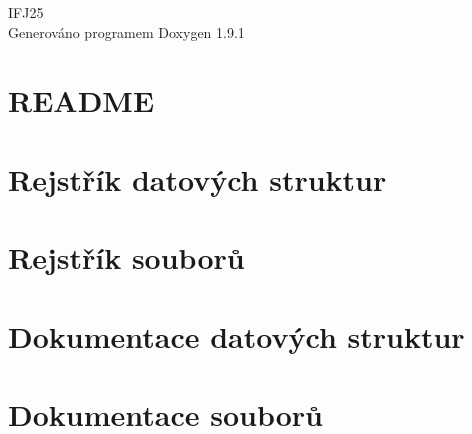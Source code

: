 \let\mypdfximage\pdfximage\def\pdfximage{\immediate\mypdfximage}\documentclass[twoside]{book}
\newcommand{\+}{\discretionary{\mbox{\scriptsize$\hookleftarrow$}}{}{}}
\newcommand{\clearemptydoublepage}{%
  \newpage{\pagestyle{empty}\cleardoublepage}%
}
\begin{document}
\raggedbottom

\hypersetup{pageanchor=false,
             bookmarksnumbered=true,
             pdfencoding=unicode
            }
\begin{titlepage}
\vspace*{7cm}
\begin{center}%
{\Large IFJ25 }\\
\vspace*{1cm}
{\large Generováno programem Doxygen 1.9.1}\\
\end{center}
\end{titlepage}
\clearemptydoublepage
{}
\tableofcontents
\clearemptydoublepage
{}
\hypersetup{pageanchor=true}

\chapter{README}
\label{md_README}

\chapter{Rejstřík datových struktur}

\chapter{Rejstřík souborů}

\chapter{Dokumentace datových struktur}





















\chapter{Dokumentace souborů}
















\backmatter
\newpage
{}
\clearemptydoublepage
{}
\printindex
\end{document}
